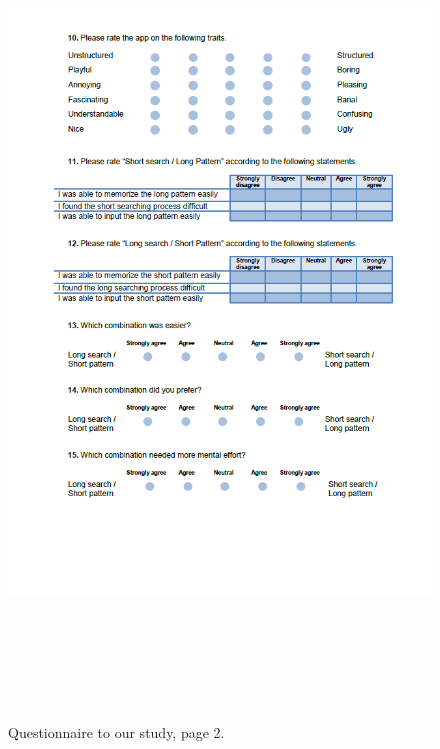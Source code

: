 \begin{figure}[H]
\includegraphics[width=15cm, height=22cm]{Chapters/graphics/survey2.PNG}
\caption{Questionnaire to our study, page 2.}
\end{figure}

